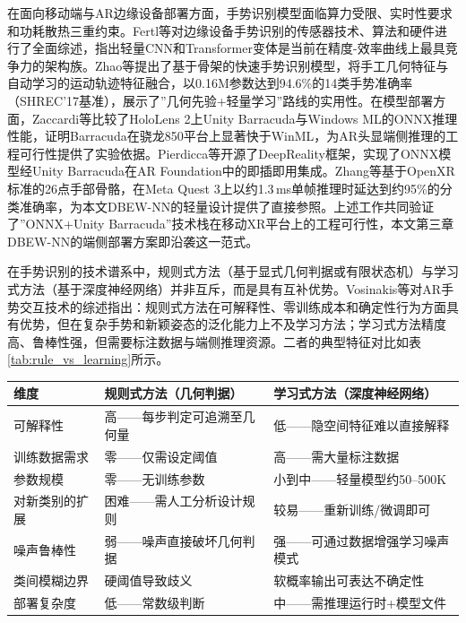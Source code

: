 在面向移动端与AR边缘设备部署方面，手势识别模型面临算力受限、实时性要求和功耗散热三重约束。Fertl等\cite{fertl2025hgr_edge_survey}对边缘设备手势识别的传感器技术、算法和硬件进行了全面综述，指出轻量CNN和Transformer变体是当前在精度-效率曲线上最具竞争力的架构族。Zhao等\cite{zhao2022fast_skeleton_hgr}提出了基于骨架的快速手势识别模型，将手工几何特征与自动学习的运动轨迹特征融合，以0.16M参数达到94.6\%的14类手势准确率（SHREC'17基准），展示了”几何先验+轻量学习”路线的实用性。在模型部署方面，Zaccardi等\cite{zaccardi2023hololens_barracuda}比较了HoloLens 2上Unity Barracuda与Windows ML的ONNX推理性能，证明Barracuda在骁龙850平台上显著快于WinML，为AR头显端侧推理的工程可行性提供了实验依据。Pierdicca等\cite{pierdicca2024deepreality}开源了DeepReality框架，实现了ONNX模型经Unity Barracuda在AR Foundation中的即插即用集成。Zhang等\cite{openxr2025gesture}基于OpenXR标准的26点手部骨骼，在Meta Quest 3上以约1.3\,ms单帧推理时延达到约95\%的分类准确率，为本文DBEW-NN的轻量设计提供了直接参照。上述工作共同验证了”ONNX+Unity Barracuda”技术栈在移动XR平台上的工程可行性，本文第三章DBEW-NN的端侧部署方案即沿袭这一范式。

在手势识别的技术谱系中，规则式方法（基于显式几何判据或有限状态机）与学习式方法（基于深度神经网络）并非互斥，而是具有互补优势。Vosinakis等\cite{vosinakis2024ar_gesture_interaction_review}对AR手势交互技术的综述指出：规则式方法在可解释性、零训练成本和确定性行为方面具有优势，但在复杂手势和新颖姿态的泛化能力上不及学习方法；学习式方法精度高、鲁棒性强，但需要标注数据与端侧推理资源。二者的典型特征对比如表\ref{tab:rule_vs_learning}所示。
\clearpage
\begin{center}
    \small
    \begin{tabular}{p{3.0cm}p{4.5cm}p{4.5cm}}
    \hline
    维度 & 规则式方法（几何判据） & 学习式方法（深度神经网络） \\
    \hline
    可解释性 & 高——每步判定可追溯至几何量 & 低——隐空间特征难以直接解释 \\
    训练数据需求 & 零——仅需设定阈值 & 高——需大量标注数据 \\
    参数规模 & 零——无训练参数 & 小到中——轻量模型约50--500K \\
    对新类别的扩展 & 困难——需人工分析设计规则 & 较易——重新训练/微调即可 \\
    噪声鲁棒性 & 弱——噪声直接破坏几何判据 & 强——可通过数据增强学习噪声模式 \\
    类间模糊边界 & 硬阈值导致歧义 & 软概率输出可表达不确定性 \\
    部署复杂度 & 低——常数级判断 & 中——需推理运行时+模型文件 \\
    \hline
    \end{tabular}
\end{center}

